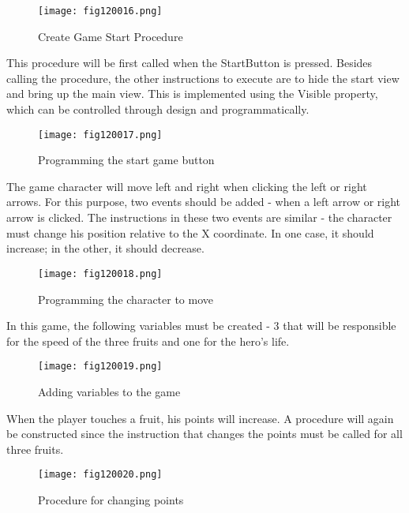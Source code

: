 \begin{figure}[H]
   \centering
   \texttt{[image: fig120016.png]}
   \caption{Create Game Start Procedure}
\label{fig120016}
\end{figure}

This procedure will be first called when the StartButton is pressed. Besides calling the procedure, the other instructions to execute are to hide the start view and bring up the main view. This is implemented using the Visible property, which can be controlled through design and programmatically.

\begin{figure}[H]
   \centering
   \texttt{[image: fig120017.png]}
   \caption{Programming the start game button}
\label{fig120017}
\end{figure}

The game character will move left and right when clicking the left or right arrows. For this purpose, two events should be added - when a left arrow or right arrow is clicked. The instructions in these two events are similar - the character must change his position relative to the X coordinate. In one case, it should increase; in the other, it should decrease.

\begin{figure}[H]
   \centering
   \texttt{[image: fig120018.png]}
   \caption{Programming the character to move}
\label{fig120018}
\end{figure}

In this game, the following variables must be created - 3 that will be responsible for the speed of the three fruits and one for the hero's life.

\begin{figure}[H]
   \centering
   \texttt{[image: fig120019.png]}
   \caption{Adding variables to the game}
\label{fig120019}
\end{figure}

When the player touches a fruit, his points will increase. A procedure will again be constructed since the instruction that changes the points must be called for all three fruits.

\begin{figure}[H]
   \centering
   \texttt{[image: fig120020.png]}
   \caption{Procedure for changing points}
\label{fig120020}
\end{figure}

